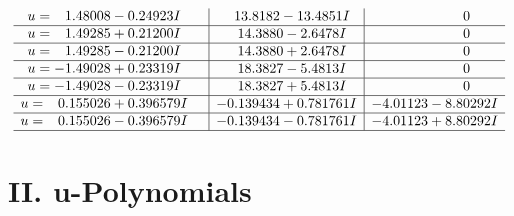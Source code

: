 \documentclass[1p]{elsarticle_modified}
\theoremstyle{definition}
\begin{document}
$$\begin{array}{c|c|c}
\begin{aligned}
u &= \phantom{-}1.48008 - 0.24923 I\end{aligned}
 & \phantom{-}13.8182 - 13.4851 I & \phantom{-0.000000 } 0 \\ \hline\begin{aligned}
u &= \phantom{-}1.49285 + 0.21200 I\end{aligned}
 & \phantom{-}14.3880 - 2.6478 I & \phantom{-0.000000 } 0 \\ \hline\begin{aligned}
u &= \phantom{-}1.49285 - 0.21200 I\end{aligned}
 & \phantom{-}14.3880 + 2.6478 I & \phantom{-0.000000 } 0 \\ \hline\begin{aligned}
u &= -1.49028 + 0.23319 I\end{aligned}
 & \phantom{-}18.3827 - 5.4813 I & \phantom{-0.000000 } 0 \\ \hline\begin{aligned}
u &= -1.49028 - 0.23319 I\end{aligned}
 & \phantom{-}18.3827 + 5.4813 I & \phantom{-0.000000 } 0 \\ \hline\begin{aligned}
u &= \phantom{-}0.155026 + 0.396579 I\end{aligned}
 & -0.139434 + 0.781761 I & -4.01123 - 8.80292 I \\ \hline\begin{aligned}
u &= \phantom{-}0.155026 - 0.396579 I\end{aligned}
 & -0.139434 - 0.781761 I & -4.01123 + 8.80292 I\\
 \hline 
 \end{array}$$\newpage
\newpage\renewcommand{\arraystretch}{1}
\centering \section*{ II. u-Polynomials}
\end{document}
